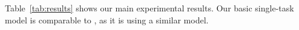 \documentclass[11pt,a4paper]{article}
\begin{document}
%
%
%
%


Table~\ref{tab:results} shows our main experimental results.
Our basic single-task model is comparable to \citet{hershcovich2017a}, as it is using a similar model.
\end{document}
